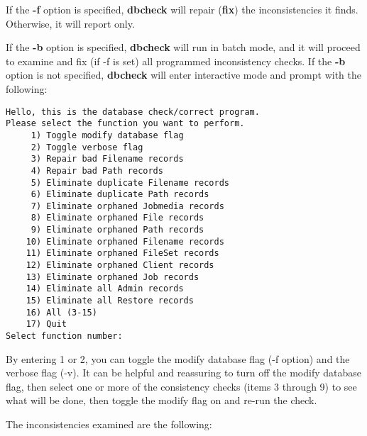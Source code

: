 If the {\bf -f} option is specified, {\bf dbcheck} will repair ({\bf fix}) the
inconsistencies it finds. Otherwise, it will report only. 

If the {\bf -b} option is specified, {\bf dbcheck} will run in batch mode, and
it will proceed to examine and fix (if -f is set) all programmed inconsistency
checks. If the {\bf -b} option is not specified, {\bf dbcheck} will enter
interactive mode and prompt with the following: 

\footnotesize
\begin{verbatim}
Hello, this is the database check/correct program.
Please select the function you want to perform.
     1) Toggle modify database flag
     2) Toggle verbose flag
     3) Repair bad Filename records
     4) Repair bad Path records
     5) Eliminate duplicate Filename records
     6) Eliminate duplicate Path records
     7) Eliminate orphaned Jobmedia records
     8) Eliminate orphaned File records
     9) Eliminate orphaned Path records
    10) Eliminate orphaned Filename records
    11) Eliminate orphaned FileSet records
    12) Eliminate orphaned Client records
    13) Eliminate orphaned Job records
    14) Eliminate all Admin records
    15) Eliminate all Restore records
    16) All (3-15)
    17) Quit
Select function number:
\end{verbatim}
\normalsize

By entering 1 or 2, you can toggle the modify database flag (-f option) and
the verbose flag (-v). It can be helpful and reassuring to turn off the modify
database flag, then select one or more of the consistency checks (items 3
through 9) to see what will be done, then toggle the modify flag on and re-run
the check. 

The inconsistencies examined are the following: 

